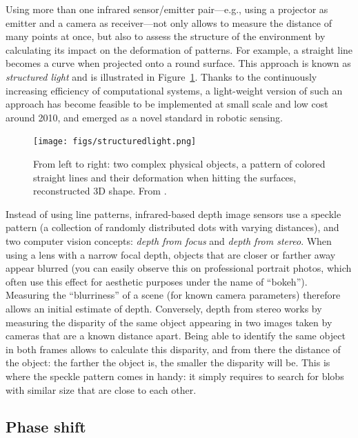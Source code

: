 Using more than one infrared sensor/emitter pair---e.g., using a projector as emitter and a camera as receiver---not only allows to measure the distance of many points at once, but also to assess the structure of the environment by calculating its impact on the deformation of patterns. For example, a straight line becomes a curve when projected onto a round surface. This approach is known as \textsl{structured light} and is illustrated in Figure~\ref{fig:struclight}.
Thanks to the continuously increasing efficiency of computational systems, a light-weight version of such an approach has become feasible to be implemented at small scale and low cost around 2010, and emerged as a novel standard in robotic sensing.

\begin{figure}
	\centering
		\texttt{[image: figs/structuredlight.png]}
	\caption{From left to right: two complex physical objects, a pattern of colored straight lines and their deformation when hitting the surfaces, reconstructed 3D shape. From \protect\cite{zhang2002rapid}.}
	\label{fig:struclight}
\end{figure}

Instead of using line patterns, infrared-based depth image sensors use a speckle pattern (a collection of randomly distributed dots with varying distances), and two computer vision concepts: \textsl{depth from focus} and \textsl{depth from stereo}. When using a lens with a narrow focal depth, objects that are closer or farther away appear blurred (you can easily observe this on professional portrait photos, which often use this effect for aesthetic purposes under the name of ``bokeh'').
Measuring the ``blurriness'' of a scene (for known camera parameters) therefore allows an initial estimate of depth.
Conversely, depth from stereo works by measuring the disparity of the same object appearing in two images taken by cameras that are a known distance apart. Being able to identify the same object in both frames allows to calculate this disparity, and from there the distance of the object: the farther the object is, the smaller the disparity will be.
This is where the speckle pattern comes in handy: it simply requires to search for blobs with similar size that are close to each other.

\subsection{Phase shift}\label{sec:phaseshiftsensors}

